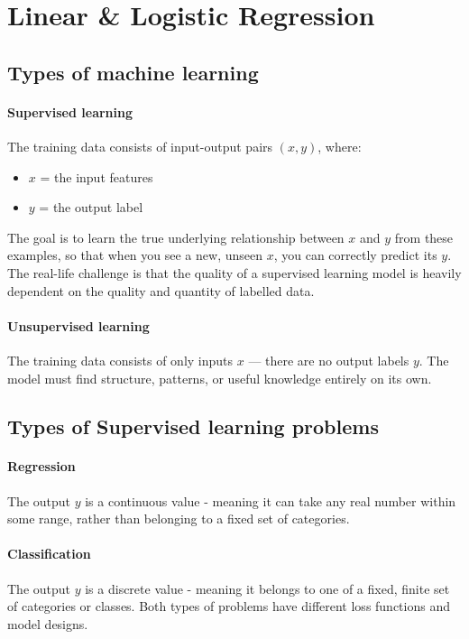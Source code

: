 \documentclass[../Probability.tex]{subfiles}
\begin{document}
\section{Linear \& Logistic Regression}
\subsection{Types of machine learning}
\paragraph{Supervised learning} The training data consists of input-output pairs $(x, y)$, where:
\begin{itemize}
    \item $x$ = the input features
    \item $y$ = the output label
\end{itemize}
The goal is to learn the true underlying relationship between $x$ and $y$ from these examples, so that when you see a new, unseen $x$, you can correctly predict its $y$.\newline
The real-life challenge is that the quality of a supervised learning model is heavily dependent on the quality and quantity of labelled data.

\paragraph{Unsupervised learning} The training data consists of only inputs $x$ — there are no output labels $y$.\newline
The model must find structure, patterns, or useful knowledge entirely on its own.

\subsection{Types of Supervised learning problems}
\paragraph{Regression} The output $y$ is a continuous value - meaning it can take any real number within some range, rather than belonging to a fixed set of categories.
\paragraph{Classification} The output $y$ is a discrete value - meaning it belongs to one of a fixed, finite set of categories or classes.\newline
Both types of problems have different loss functions and model designs.
\end{document}
